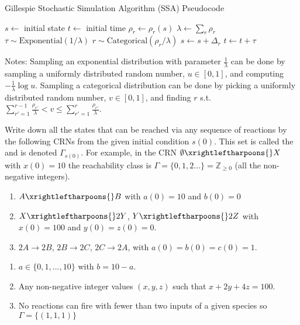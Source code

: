 \begin{breakout}[label=box:crn:gillespie-ssa]{Gillespie Stochastic Simulation Algorithm (SSA) Pseudocode}
\begin{algorithmic}%
  \State $s \gets$ initial state
  \State $t \gets$ initial time
    \State $\rho_r \gets \rho_r(s)$ 
    \State $\lambda \gets \sum_r \rho_r$ 
    \State $\tau \sim \mathrm{Exponential}(1/\lambda)$ 
    \State $r \sim \mathrm{Categorical}(\rho_r/\lambda)$ 
    \State $s \gets s + \Delta_r$ 
    \State $t \gets t + \tau$ 
  \EndWhile
\end{algorithmic}
\tcblower
Notes:
  Sampling an exponential distribution with parameter $\frac{1}{\lambda}$ can be done by sampling a uniformly distributed random number, $u\in[0,1]$, and computing $-\frac{1}{\lambda}\log u$.
  Sampling a categorical distribution can be done by picking a uniformly distributed random number, $v\in[0,1]$, and finding $r$ s.t.\ $\sum_{r'=1}^{r-1} \frac{\rho_{r'}}{\lambda} < v \le \sum_{r'=1}^r \frac{\rho_{r'}}{\lambda}$.
\end{breakout}
%
\begin{popquiz}[label=pq:crn:reachability]
  Write down all the states that can be reached via any sequence of reactions by the following CRNs from the given initial condition $s(0)$. This set is called the  and is denoted $\Gamma_{s(0)}$. For example, in the CRN  $\emptyset \xrightleftharpoons{} X$ with $x(0) = 10$ the reachability class is $\Gamma = \{0, 1, 2 ... \} = \mathbb{Z}_{\geq 0}$ (all the non-negative integers).
  \begin{enumerate}
    \item $A \xrightleftharpoons{} B$ with $a(0) = 10$ and $b(0) = 0$
    \item $X \xrightleftharpoons{} 2 Y$, $Y \xrightleftharpoons{} 2 Z$ with $x(0) = 100$ and $y(0) = z(0) = 0$.
    \item $2 A \xrightarrow{} 2 B$, $2 B \xrightarrow{} 2 C$, $2 C \xrightarrow{} 2 A$, with $a(0) = b(0) = c(0) = 1$.
  \end{enumerate}
\solution
  \begin{enumerate}
    \item $a \in \{0, 1, ..., 10\}$ with $b = 10-a$.
    \item Any non-negative integer values $(x, y, z)$ such that $x + 2y + 4 z = 100$.
    \item No reactions can fire with fewer than two inputs of a given species so $\Gamma = \{(1, 1, 1)\}$
  \end{enumerate}
\end{popquiz}
%
